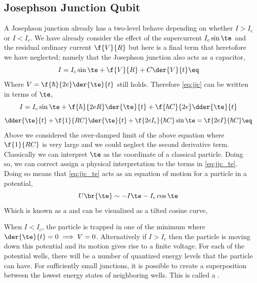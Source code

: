 \documentclass{article}
\begin{document}
\subsection{Josephson Junction Qubit}
A Josephson junction already has a two-level behave depending on whether $I > I_c$ or $I < I_c$. We have already consider the effect of the supercurrent $I_c \sin \te$ and the residual ordinary current $\f{V}{R}$ but here is a final term that heretofore we have neglected; namely that the Josephson junction also acts as a capacitor,
\[ I = I_c \sin \te + \f{V}{R} + C \der{V}{t} \eq \label{eq:jjc}\]
Where $V = \f{\hbar}{2e} \der{\te}{t}$ still holds. Therefore \cref{eq:jjc} can be written in terms of $\te$,
\[ I = I_c \sin \te + \f{\hbar}{2eR}\der{\te}{t} + \f{\hbar C}{2e} \dder{\te}{t} \]
\[ \dder{\te}{t} + \f{1}{RC} \der{\te}{t} + \f{2eI_c}{\hbar C} \sin \te = \f{2eI}{\hbar C} \eq \label{eq:jjc_te}\]
Above we considered the over-damped limit of the above equation where $\f{1}{RC}$ is very large and we could neglect the second derivative term. Classically we can interpret $\te$ as the coordinate of a classical particle. Doing so, we can correct assign a physical interpretation to the terms in \cref{eq:jjc_te}. Doing so means that \cref{eq:jjc_te} acts as an equation of motion for a particle in a potential,
\[ U\br{\te} \sim - I \te - I_c \cos \te \]
Which is known as a  and can be visualized as a tilted cosine curve,
\begin{center}
\end{center}
When $I < I_c$, the particle is trapped in one of the minimum where $\der{\te}{t} = 0 \implies V = 0$. Alternatively if $I > I_c$ then the particle is moving down this potential and its motion gives rise to a finite voltage. For each of the potential wells, there will be a number of quantized energy levels that the particle can have. For sufficiently small junctions, it is possible to create a superposition between the lowest energy states of neighboring wells. This is called a .
\end{document}
